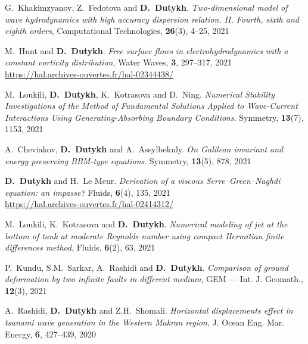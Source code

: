 \begin{etaremune}
  \item G.~Khakimzyanov, Z.~Fedotova and \textbf{D.~Dutykh}. \textit{Two-dimensional model of wave hydrodynamics with high accuracy dispersion relation. II. Fourth, sixth and eighth orders}, Computational Technologies, \textbf{26}(3), 4--25, 2021 %
  
  \item M.~Hunt and \textbf{D.~Dutykh}. \textit{Free surface flows in electrohydrodynamics with a constant vorticity distribution}, Water Waves, \textbf{3}, 297--317, 2021 \\ %
  \url{https://hal.archives-ouvertes.fr/hal-02344438/}
  
  \item M.~Loukili, \textbf{D.~Dutykh}, K.~Kotrasova and D.~Ning. \textit{Numerical Stability Investigations of the Method of Fundamental Solutions Applied to Wave-Current Interactions Using Generating-Absorbing Boundary Conditions}. Symmetry, \textbf{13}(7), 1153, 2021 %
  
  \item A.~Cheviakov, \textbf{D.~Dutykh} and A.~Assylbekuly. \textit{On Galilean invariant and energy preserving BBM-type equations}. Symmetry, \textbf{13}(5), 878, 2021 %
  
  \item \textbf{D.~Dutykh} and H.~Le Meur. \textit{Derivation of a viscous Serre--Green--Naghdi equation: an impasse?} Fluids, \textbf{6}(4), 135, 2021 \\ %
  \url{https://hal.archives-ouvertes.fr/hal-02414312/}
  
  \item M.~Loukili, K.~Kotrasova and \textbf{D.~Dutykh}. \textit{Numerical modeling of jet at the bottom of tank at moderate Reynolds number using compact Hermitian finite differences method}, Fluids, \textbf{6}(2), 63, 2021 %
  
  \item P.~Kundu, S.M.~Sarkar, A.~Rashidi and \textbf{D.~Dutykh}. \textit{Comparison of ground deformation by two infinite faults in different medium}, GEM --- Int. J. Geomath., \textbf{12}(3), 2021 %
  
  
  \item A.~Rashidi, \textbf{D.~Dutykh} and Z.H.~Shomali. \textit{Horizontal displacements effect in tsunami wave generation in the Western Makran region}, J. Ocean Eng. Mar. Energy, \textbf{6}, 427--439, 2020 %
  

\end{etaremune}
